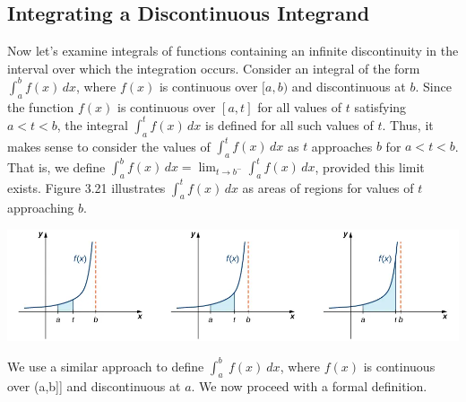 \documentclass{report}
\begin{document}
        \subsection*{Integrating a Discontinuous Integrand}
        \bigbreak \noindent 
        Now let’s examine integrals of functions containing an infinite discontinuity in the interval over which the integration occurs. Consider an integral of the form $\int_a^b f(x) \, dx$, where $f(x)$ is continuous over $[a,b)$ and discontinuous at $b$. Since the function $f(x)$ is continuous over $[a,t]$ for all values of $t$ satisfying $a < t < b$, the integral $\int_a^t f(x) \, dx$ is defined for all such values of $t$. Thus, it makes sense to consider the values of $\int_a^t f(x) \, dx$ as $t$ approaches $b$ for $a < t < b$. That is, we define $\int_a^b f(x) \, dx = \lim_{t \to b^-} \int_a^t f(x) \, dx$, provided this limit exists. Figure 3.21 illustrates $\int_a^t f(x) \, dx$ as areas of regions for values of $t$ approaching $b$.
        \bigbreak \noindent 
        \begin{center}
            \includegraphics[scale=0.5]{./figures/mane4.png}
        \end{center}
        \bigbreak \noindent 
        We use a similar approach to define $\int_{a}^{b}\ f(x)\ dx $, where $f(x)$ is continuous over (a,b]] and discontinuous at $a$. We now proceed with a formal definition.
        \pagebreak \bigbreak \noindent 
\end{document}
